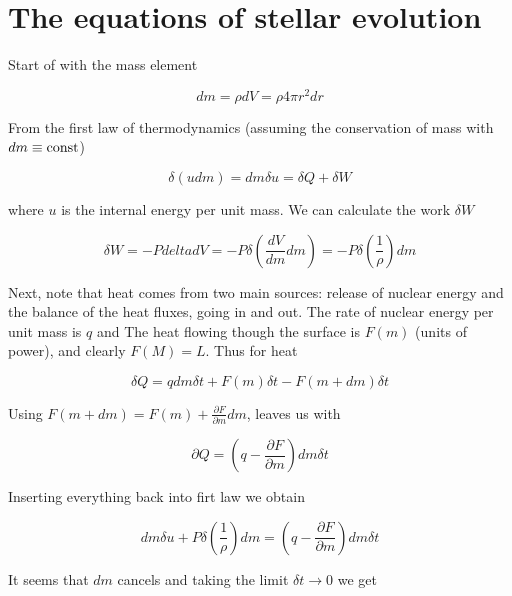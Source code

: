 \section{The equations of stellar evolution}

Start of with the mass element

\begin{equation*}
    dm = \rho dV = \rho 4 \pi r^2 dr
\end{equation*}

From the first law of thermodynamics (assuming the conservation of mass with $dm \equiv {\rm const}$) 

\begin{equation*}
    \delta (u dm) = dm \delta u = \delta Q + \delta W
\end{equation*}

where $u$ is the internal energy per unit mass. We can calculate the work $\delta W$

\begin{equation*}
    \delta W = - P delta dV = - P \delta \left(\frac{dV}{dm} dm \right) = - P \delta \left( \frac{1}{\rho} \right) dm
\end{equation*}

Next, note that heat comes from two main sources: release of nuclear energy and the balance of the heat fluxes, going in and out. The rate of nuclear energy per unit mass is $q$ and The heat flowing though the surface is $F(m)$ (units of power), and clearly $F(M) = L$. Thus for heat

\begin{equation*}
    \delta Q = q dm \delta t + F(m) \delta t - F(m + dm) \delta t
\end{equation*}

Using $F(m + dm) = F(m) + \frac{\partial F}{\partial m} dm$, leaves us with

\begin{equation*}
    \partial Q = \left( q - \frac{\partial F}{\partial m} \right) dm \delta t
\end{equation*}

Inserting everything back into firt law we obtain

\begin{equation*}
    dm \delta u + P \delta \left( \frac{1}{\rho} \right) dm = \left( q - \frac{\partial F}{\partial m} \right) dm \delta t
\end{equation*}

It seems that $dm$ cancels and taking the limit $\delta t \rightarrow 0$ we get

